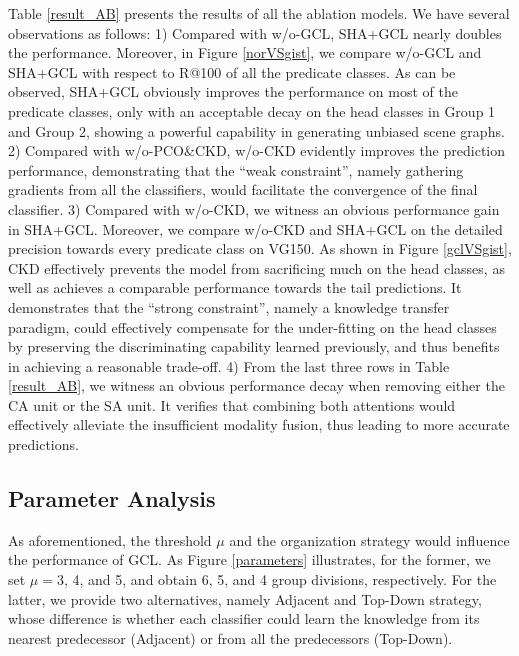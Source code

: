 \documentclass[10pt,twocolumn,letterpaper]{article}
\begin{document}
Table \ref{result_AB} presents the results of all the ablation models. We have several observations as follows: 1) Compared with w/o-GCL, SHA+GCL nearly doubles the performance. Moreover, in Figure \ref{norVSgist}, we compare w/o-GCL and SHA+GCL with respect to R@100 of all the predicate classes. As can be observed, SHA+GCL obviously improves the performance on most of the predicate classes, only with an acceptable decay on the head classes in Group 1 and Group 2, showing a powerful capability in generating unbiased scene graphs. 2) Compared with w/o-PCO\&CKD, w/o-CKD evidently improves the prediction performance, demonstrating that the ``weak constraint'', namely gathering gradients from all the classifiers, would facilitate the convergence of the final classifier. 3) Compared with w/o-CKD, we witness an obvious performance gain in SHA+GCL. Moreover, we compare w/o-CKD and SHA+GCL on the detailed precision towards every predicate class on VG150. As shown in Figure \ref{gclVSgist}, CKD effectively prevents the model from sacrificing much on the head classes, as well as achieves a comparable performance towards the tail predictions. It demonstrates that the ``strong constraint'', namely a knowledge transfer paradigm, could effectively compensate for the under-fitting on the head classes by preserving the discriminating capability learned previously, and thus benefits in achieving a reasonable trade-off. 4) From the last three rows in Table \ref{result_AB}, we witness an obvious performance decay when removing either the CA unit or the SA unit. It verifies that combining both attentions would effectively alleviate the insufficient modality fusion, thus leading to more accurate predictions.

\subsection{Parameter Analysis}



As aforementioned, the threshold $\mu$ and the organization strategy would influence the performance of GCL. As Figure \ref{parameters} illustrates, for the former, we set $\mu=$3, 4, and 5, and obtain 6, 5, and 4 group divisions, respectively. For the latter, we provide two alternatives, namely Adjacent and Top-Down strategy, whose difference is whether each classifier could learn the knowledge from its nearest predecessor (Adjacent) or from all the predecessors (Top-Down).
\end{document}
